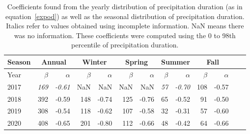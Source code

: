\begin{table}[bh]
  \begin{center}
    \begin{tabular}{|l|*{11}{r|}r|}
      \hline
      Season    &       \multicolumn{2}{|c|}{Annual}          & \multicolumn{2}{|c|}{Winter}& \multicolumn{2}{|c|}{Spring}  & \multicolumn{2}{|c|}{Summer} &\multicolumn{2}{|c|}{Fall}  \\
      \hline
      Year      & $\beta $ & $\alpha$  & $\beta $ & $\alpha$ & $\beta $ & $\alpha$ & $\beta $ & $\alpha$ & $\beta $ & $\alpha$\\
      \hline
      2017      & \textit{169}  & \textit{-0.61}  & NaN & NaN & NaN & NaN & \textit{57}  & \textit{-0.70}  & 108  & -0.57  \\
      2018      & 392           & -0.59  & 148 & -0.74 & 125 & -0.76 & 65  & -0.52  & 91 & -0.50  \\
      2019      & 308           & -0.54  & 118  & -0.62 & 107 & -0.58 & 32 & -0.31  & 57 &  -0.60 \\
      2020      & 408           & -0.65   & 201  & -0.80 & 112  & -0.66 & 48  & -0.42 & 64 & -0.66\\
      \hline
    \end{tabular}
  \end{center}
\caption[Year comparison of coefficients of precipitation duration up to its
  98th percentile]{\label{firsttable}Coefficients found from the yearly
  distribution of precipitation duration (as in equation~\ref{expod}) as
  well as the seasonal distribution of precipitation duration. Italics refer
  to values obtained using incomplete information. NaN means there was no
  information. These coefficients were computed using the 0 to 98th
  percentile of precipitation duration.}
\end{table}
